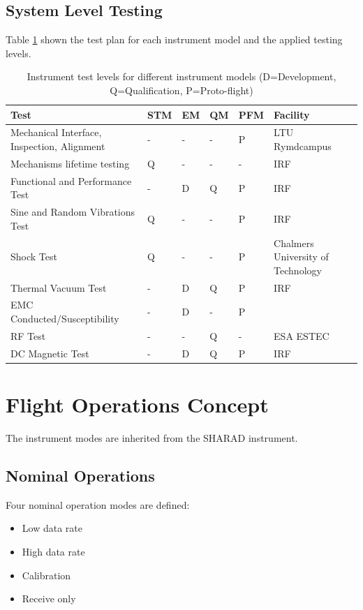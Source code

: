 \subsection{System Level Testing}
%
%
Table \ref{tab:instrument_testing} shown the test plan for each instrument model and the applied testing levels.
%
\begin{table}[H]
\centering
\caption{Instrument test levels for different instrument models (D=Development, Q=Qualification, P=Proto-flight)}
\label{tab:instrument_testing}
\begin{tabular}{p{}p{}p{}p{}p{}p{}}
\hline
\textbf{Test} & \textbf{STM} & \textbf{EM} & \textbf{QM}& \textbf{PFM} & \textbf{Facility}\\
\hline
Mechanical Interface, Inspection, Alignment & - & - & - & P & LTU Rymdcampus\\
Mechanisms lifetime testing & Q & - & - & - & \ac{IRF}\\
Functional and Performance Test & - & D & Q & P & \ac{IRF}\\
Sine and Random Vibrations Test & Q & - & - & P & \ac{IRF}\\
Shock Test & Q & - & - & P &Chalmers University of Technology\cite{Jonsson}\\
Thermal Vacuum Test & - & D & Q & P & \ac{IRF}\\
EMC Conducted/Susceptibility & - & D & - & P &\\
RF Test & - & - & Q & - & ESA ESTEC\\
DC Magnetic Test & - & D & Q & P & \ac{IRF}\\
\hline
\end{tabular}
\end{table}
%
%
%
\section{Flight Operations Concept}
%
The instrument modes are inherited from the SHARAD instrument\cite{SHARAD_ppt}.
%
\subsection{Nominal Operations}
%
Four nominal operation modes are defined:
\begin{itemize}
\item Low data rate
\item High data rate
\item Calibration
\item Receive only
\end{itemize}
%
